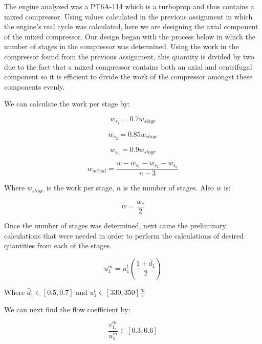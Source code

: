 \documentclass[titlepage]{article}
\begin{document}
    The engine analyzed was a PT6A-114 which is a turboprop and thus contains a mixed
compressor. Using values calculated in the previous assignment in which the engine’s real cycle
was calculated, here we are designing the axial component of the mixed compressor. Our design
began with the process below in which the number of stages in the compressor was determined.
Using the work in the compressor found from the previous assignment, this quantity is divided
by two due to the fact that a mixed compressor contains both an axial and centrifugal component
so it is efficient to divide the work of the compressor amongst these components evenly.


We can calculate the work per stage by:

\begin{equation}
    w_{s_{1}} = 0.7 w_{stage}
\end{equation}

\begin{equation}
    w_{s_{2}} = 0.85 w_{stage}
\end{equation}

\begin{equation}
    w_{s_{n}} = 0.9 w_{stage}
\end{equation}

\begin{equation}
    w_{actual} = \frac{w - w_{s_{1}} - w_{s_{2}} -w_{s_{n}}}{n - 3}
\end{equation}

Where $w_{stage}$ is the work per stage, $n$ is the number of stages. Also $w$ is:

\begin{equation}
    w = \frac{w_{c}}{2}
\end{equation}

Once the number of stages was
determined, next came the preliminary calculations that were needed in order to perform the
calculations of desired quantities from each of the stages.

\begin{equation}
    u_{1}^{m} = u_{1}^{t} \left(\frac{1+\bar{d}_{1}}{2}\right)
\end{equation}

Where $\bar{d}_{1} \in [0.5, 0.7]$ and $u_{1}^{t} \in [330, 350] \frac{m}{s}$  

We can next find the flow coefficient by:

\begin{equation}
    \frac{c_{1_{a}}^{m}}{u_{1}^{m}} \in [0.3, 0.6]
\end{equation}
\end{document}
